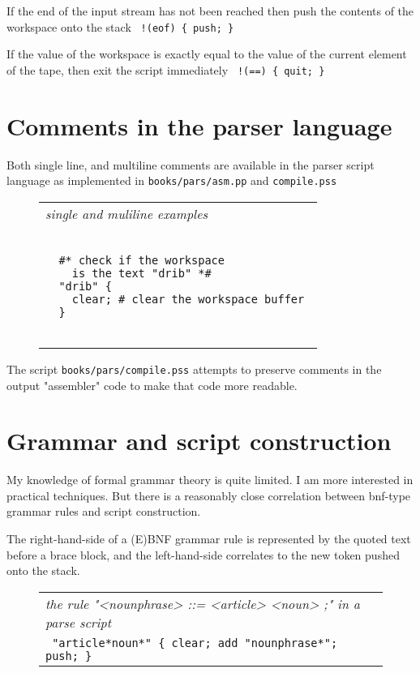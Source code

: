 \documentclass[a4paper,12pt]{article}
\begin{document}
 If the end of the input stream has not been reached
 then push the contents of the workspace onto the
 stack 
 \verb| !(eof) { push; }  |

 
 If the value of the workspace is exactly equal to the
 value of the current element of the tape, then exit
 the script immediately 
 \verb| !(==) { quit; }  |


\section{Comments in the parser language}

 Both single line, and multiline comments are available in the
 parser script language as implemented in \texttt{books/pars/asm.pp} and
 \texttt{compile.pss}
 \begin{figure}
 \begin{tabular}{ l }
 \emph{ single and muliline examples } \\ 
 \begin{lstlisting}[breaklines] 
 
  #* check if the workspace 
    is the text "drib" *#
  "drib" {
    clear; # clear the workspace buffer 
  }
 
 \end{lstlisting} 
 \end{tabular} 

 \end{figure}

The script \texttt{books/pars/compile.pss} attempts to preserve comments
in the output "assembler" code to make that code more readable.

\section{Grammar and script construction}

  My knowledge of formal grammar theory is quite limited. I am more
  interested in practical techniques. But there is a reasonably close
  correlation between bnf-type grammar rules and script construction.
  
  The right-hand-side of a (E)BNF grammar rule is represented by the
  quoted text before a brace block, and the left-hand-side
  correlates to the new token pushed onto the stack.
 \begin{figure}
 \begin{tabular}{ l }
 \emph{ the rule "<nounphrase> ::= <article> <noun> ;" in a parse script } \\ 
 \verb| "article*noun*" { clear; add "nounphrase*"; push; } |
 \end{tabular} 
 \end{figure}
\end{document}
